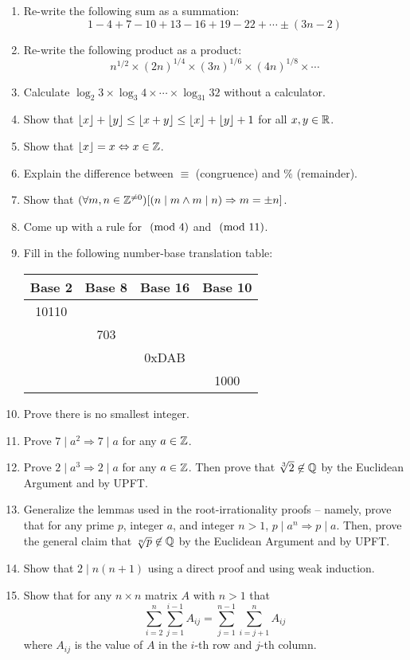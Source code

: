 \documentclass[main.tex]{subfiles}
\begin{document}
\begin{enumerate}
	\item Re-write the following sum as a summation: \[1-4+7-10+13-16+19-22+ \cdots \pm (3n-2)\]
	\item Re-write the following product as a product: \[n^{1/2} \times (2n)^{1/4} \times (3n)^{1/6} \times (4n)^{1/8} \times \cdots \]
	\item Calculate \(\log_2 3 \times \log_3 4 \times \cdots \times \log_{31} 32\) without a calculator.
	\item Show that \(\lfloor x\rfloor + \lfloor y\rfloor \leq \lfloor x+y\rfloor \leq \lfloor x\rfloor + \lfloor y\rfloor + 1\) for all \(x,y \in \mathbb{R}\).
	\item Show that \(\lfloor x\rfloor = x \Leftrightarrow x \in \mathbb{Z}\).
	\item Explain the difference between \(\equiv\) (congruence) and \(\%\) (remainder).
	\item Show that \((\forall m,n \in \mathbb{Z}^{\neq 0})[(n \mid m \land m \mid n) \Rightarrow m = \pm n]\).
	\item Come up with a rule for \(\ (\mathrm{mod}\ 4)\) and \(\ (\mathrm{mod}\ 11)\).
	\item Fill in the following number-base translation table:
	
	\begin{tabular}{c|c|c|c}
		Base 2 & Base 8 & Base 16 & Base 10 \\
		\midrule
		10110 & & & \\
		\midrule
		& 703 & & \\
		\midrule
		& & 0xDAB & \\
		\midrule
		& & & 1000
	\end{tabular}
	
	\item Prove there is no smallest integer.
	\item Prove \(7 \mid a^2 \Rightarrow 7 \mid a\) for any \(a \in \mathbb{Z}\).
	\item Prove \(2 \mid a^3 \Rightarrow 2 \mid a\) for any \(a \in \mathbb{Z}\). Then prove that \(\sqrt[3]{2} \not\in \mathbb{Q}\) by the Euclidean Argument and by UPFT.
	\item Generalize the lemmas used in the root-irrationality proofs -- namely, prove that for any prime \(p\), integer \(a\), and integer \(n > 1\), \(p \mid a^n \Rightarrow p \mid a\). Then, prove the general claim that \(\sqrt[n]{p} \not\in \mathbb{Q}\) by the Euclidean Argument and by UPFT.
	
	\item Show that \(2 \mid n(n+1)\) using a direct proof and using weak induction.
	\item Show that for any \(n \times n\) matrix \(A\) with \(n > 1\) that \[\sum_{i=2}^{n} \sum_{j=1}^{i-1} A_{ij} = \sum_{j=1}^{n-1} \sum_{i=j+1}^{n} A_{ij}\] where \(A_{ij}\) is the value of \(A\) in the \(i\)-th row and \(j\)-th column.
	

\end{enumerate}
\end{document}
